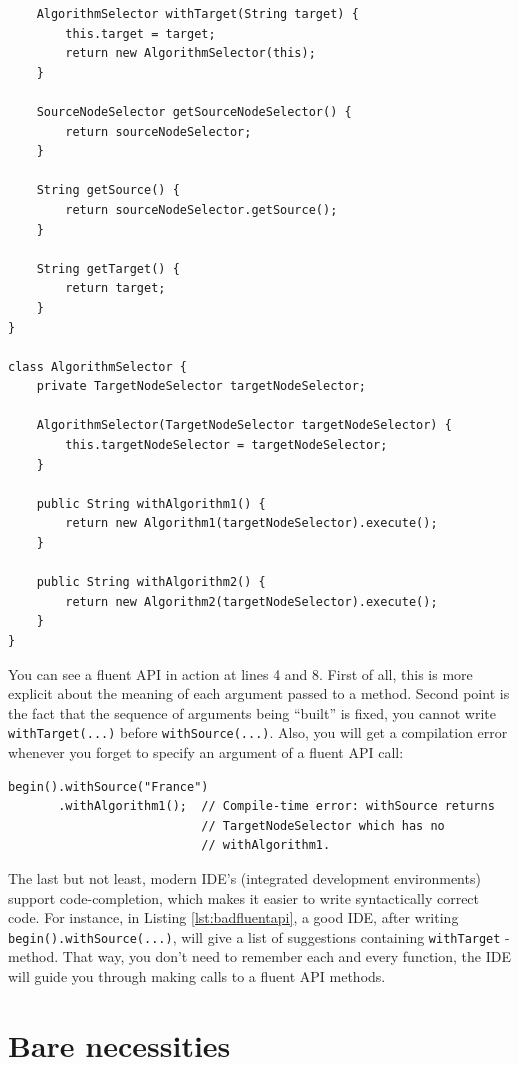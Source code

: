 \documentclass[oneside]{book}
\begin{document}
\begin{lstlisting}
    AlgorithmSelector withTarget(String target) {
        this.target = target;
        return new AlgorithmSelector(this);
    }
    
    SourceNodeSelector getSourceNodeSelector() {
        return sourceNodeSelector;
    }
    
    String getSource() {
        return sourceNodeSelector.getSource();
    }
    
    String getTarget() {
        return target;
    }
}

class AlgorithmSelector {
    private TargetNodeSelector targetNodeSelector;
    
    AlgorithmSelector(TargetNodeSelector targetNodeSelector) {
        this.targetNodeSelector = targetNodeSelector;
    } 
    
    public String withAlgorithm1() {
        return new Algorithm1(targetNodeSelector).execute();
    }
    
    public String withAlgorithm2() {
        return new Algorithm2(targetNodeSelector).execute();
    }
}
\end{lstlisting}
You can see a fluent API in action at lines 4 and 8. First of all, this is more explicit about the meaning of each argument passed to a method. Second point is the fact that the sequence of arguments being ``built'' is fixed, you cannot write \texttt{withTarget(...)} before \texttt{withSource(...)}. Also, you will get a compilation error whenever you forget to specify an argument of a fluent API call:
\newpage
\lstset{
numbers=none
}
\begin{lstlisting}[caption={Bad fluent API call},label=lst:badfluentapi]
begin().withSource("France")
       .withAlgorithm1();  // Compile-time error: withSource returns 
                           // TargetNodeSelector which has no 
                           // withAlgorithm1.
\end{lstlisting}
The last but not least, modern IDE's (integrated development environments) support code-completion, which makes it easier to write syntactically correct code. For instance, in Listing \ref{lst:badfluentapi}, a good IDE, after writing \\ \texttt{begin().withSource(...)}, will give a list of suggestions containing \texttt{withTarget} - method. That way, you don't need to remember each and every function, the IDE will guide you through making calls to a fluent API methods.

\section{Bare necessities}
\end{document}
